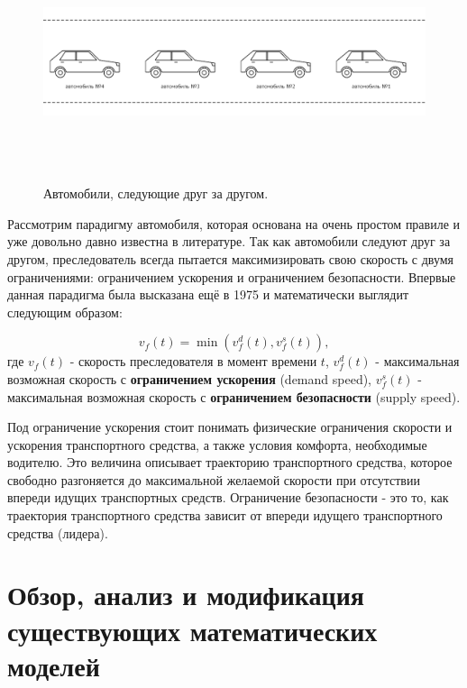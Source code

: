 \documentclass[12pt, a4paper]{extarticle}
\numberwithin{equation}{section}
\numberwithin{figure}{section}
\begin{document}
\begin{figure}[h!]  
	\begin{center}
		\includegraphics[keepaspectratio,width=160mm,height=70mm]{Images/car_following.png}
	\end{center}
	\caption{Автомобили, следующие друг за другом.}
	\label{car_following}
\end{figure}

Рассмотрим парадигму автомобиля, которая основана на очень простом правиле и уже довольно давно известна в литературе. Так как автомобили следуют друг за другом, преследователь всегда пытается максимизировать свою скорость с двумя ограничениями: ограничением ускорения и ограничением безопасности. Впервые данная парадигма была высказана ещё в 1975 \cite{GippsModel} и математически выглядит следующим образом:

\begin{equation*} \label{following_paradigm}
v_f(t) = \min(v_f^d(t), v_f^s(t)),
\end{equation*}
где $v_f(t)$ - скорость преследователя в момент времени $t$, $v_f^d(t)$ - максимальная возможная скорость с \textbf{ограничением ускорения} (demand speed), $v_f^s(t)$ - максимальная возможная скорость с \textbf{ограничением безопасности} (supply speed).

Под ограничение ускорения стоит понимать физические ограничения скорости и ускорения транспортного средства, а также условия комфорта, необходимые водителю. Это величина описывает траекторию транспортного средства, которое свободно разгоняется до максимальной желаемой скорости при отсутствии впереди идущих транспортных средств. Ограничение безопасности - это то, как траектория транспортного средства зависит от впереди идущего транспортного средства (лидера).

\section{Обзор, анализ и модификация существующих математических моделей}
\end{document}
